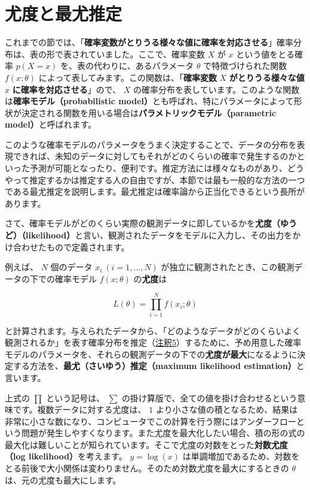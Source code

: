 \section{尤度と最尤推定}


これまでの節では、「\textbf{確率変数がとりうる様々な値に確率を対応させる}」確率分布は、表の形で表されていました。ここで、確率変数 $X$ が $x$ という値をとる確率 $p(X = x)$ を、表の代わりに、あるパラメータ $\theta$ で特徴づけられた関数 $f(x; \theta)$ によって表してみます。この関数は、「\textbf{確率変数} $X$ \textbf{がとりうる様々な値} $x$ \textbf{に確率を対応させる}」ので、 $X$ の確率分布を表しています。このような関数は\textbf{確率モデル（probabilistic model）}とも呼ばれ、特にパラメータによって形状が決定される関数を用いる場合は\textbf{パラメトリックモデル（parametric model）}と呼ばれます。


このような確率モデルのパラメータをうまく決定することで、データの分布を表現できれば、未知のデータに対してもそれがどのくらいの確率で発生するのかといった予測が可能となったり、便利です。推定方法には様々なものがあり、どうやって推定するかは推定する人の自由ですが、本節では最も一般的な方法の一つである最尤推定を説明します。最尤推定は確率論から正当化できるという長所があります。


さて、確率モデルがどのくらい実際の観測データに即しているかを\textbf{尤度（ゆうど）（likelihood）}と言い、観測されたデータをモデルに入力し、その出力をかけ合わせたもので定義されます。


例えば、 $N$ 個のデータ $x_i \ (i=1,\dots,N)$ が独立に観測されたとき、この観測データの下での確率モデル $f(x; \theta)$ の\textbf{尤度}は


\[
L(\theta) = \prod_{i=1}^N f(x_i; \theta)
\]


と計算されます。与えられたデータから、「どのようなデータがどのくらいよく観測されるか」を表す確率分布を推定（\hyperref[06b-basics-of-probability-statistics-note5]{注釈5}）するために、予め用意した確率モデルのパラメータを、それらの観測データの下での\textbf{尤度が最大}になるように決定する方法を、\textbf{最尤（さいゆう）推定（maximum likelihood estimation）}と言います。


上式の $\prod$ という記号は、 $\sum$ の掛け算版で、全ての値を掛け合わせるという意味です。複数データに対する尤度は、 $1$ より小さな値の積となるため、結果は非常に小さな数になり、コンピュータでこの計算を行う際にはアンダーフローという問題が発生しやすくなります。また尤度を最大化したい場合、積の形の式の最大化は難しいことが知られています。そこで尤度の対数をとった\textbf{対数尤度（log likelihood）}を考えます。 $y = \log(x)$ は単調増加であるため、対数をとる前後で大小関係は変わりません。そのため対数尤度を最大にするときの $\theta$ は、元の尤度も最大にします。


